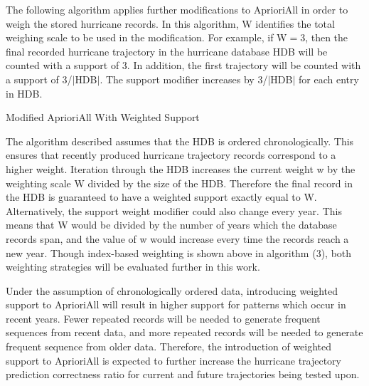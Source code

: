\documentclass[12pt,conference]{IEEEtran}
\begin{document}
The following algorithm applies further modifications to AprioriAll in order to weigh the stored hurricane records. In this algorithm, W identifies the total weighing scale to be used in the modification. For example, if W$=$3, then the final recorded hurricane trajectory in the hurricane database HDB will be counted with a support of 3. In addition, the first trajectory will be counted with a support of 3/$\lvert$HDB$\rvert$. The support modifier increases by 3/$\lvert$HDB$\rvert$ for each entry in HDB.

\begin{algorithm}[H]
  \caption{Modified AprioriAll With Weighted Support}
  \label{aprioriall_for_hurricanes}
  \begin{algorithmic}[1]
    \EndFor
  \EndFor
  \end{algorithmic}
\end{algorithm}

The algorithm described assumes that the HDB is ordered chronologically. This ensures that recently produced hurricane trajectory records correspond to a higher weight. Iteration through the HDB increases the current weight w by the weighting scale W divided by the size of the HDB. Therefore the final record in the HDB is guaranteed to have a weighted support exactly equal to W. Alternatively, the support weight modifier could also change every year. This means that W would be divided by the number of years which the database records span, and the value of w would increase every time the records reach a new year. Though index-based weighting is shown above in algorithm (3), both weighting strategies will be evaluated further in this work.

Under the assumption of chronologically ordered data, introducing weighted support to AprioriAll will result in higher support for patterns which occur in recent years. Fewer repeated records will be needed to generate frequent sequences from recent data, and more repeated records will be needed to generate frequent sequence from older data. Therefore, the introduction of weighted support to AprioriAll is expected to further increase the hurricane trajectory prediction correctness ratio for current and future trajectories being tested upon.
\end{document}
